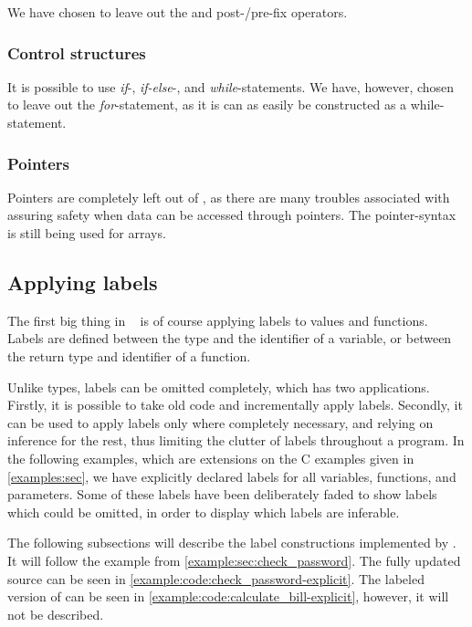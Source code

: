 We have chosen to leave out the \tk{++} and \tk{-{}-} post-/pre-fix operators.

\subsubsection{Control structures}
It is possible to use \emph{if}-, \emph{if-else}-, and \emph{while}-statements.
We have, however, chosen to leave out the \emph{for}-statement, as it is can as easily be constructed as a while-statement.

\subsubsection{Pointers}
Pointers are completely left out of \thelang, as there are many troubles associated with assuring safety when data can be accessed through pointers.
The pointer-syntax is still being used for arrays.

\subsection{Applying labels}
The first big thing in \thelang~ is of course applying labels to values and functions.
Labels are defined between the type and the identifier of a variable, or between the return type and identifier of a function.

Unlike types, labels can be omitted completely, which has two applications.
Firstly, it is possible to take old code and incrementally apply labels.
Secondly, it can be used to apply labels only where completely necessary, and relying on inference for the rest, thus limiting the clutter of labels throughout a program.
In the following examples, which are extensions on the C examples given in \cref{examples:sec}, we have explicitly declared labels for all variables, functions, and parameters.
Some of these labels have been deliberately faded to show labels which could be omitted, in order to display which labels are inferable.

The following subsections will describe the label constructions implemented by \thelang.
It will follow the  example from \cref{example:sec:check_password}.
The fully updated source can be seen in \cref{example:code:check_password-explicit}.
The labeled version of  can be seen in \cref{example:code:calculate_bill-explicit}, however, it will not be described.

